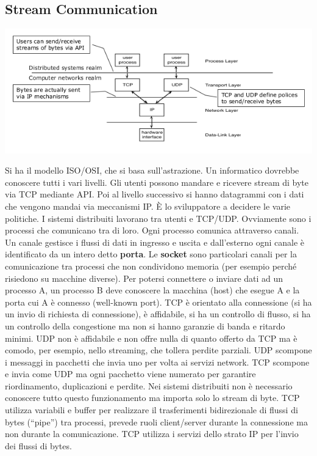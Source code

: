 \documentclass[a4paper,12pt, oneside]{book}
\begin{document}
\subsection{Stream Communication}
\begin{center}
\includegraphics[scale=2.5]{img/sc.png}
\end{center}
Si ha il modello ISO/OSI, che si basa sull'astrazione. Un informatico dovrebbe conoscere tutti i vari livelli. Gli utenti possono mandare e ricevere stream di byte via TCP mediante API. Poi al livello successivo si hanno datagrammi con i dati che vengono mandai via meccanismi IP. È lo sviluppatore a decidere le varie politiche. I sistemi distribuiti lavorano tra utenti e TCP/UDP. Ovviamente sono i processi che comunicano tra di loro. Ogni processo comunica attraverso canali. Un canale gestisce i flussi di dati in ingresso e uscita e dall'esterno ogni canale è identificato da un intero detto \textbf{porta}. Le \textbf{socket} sono particolari canali per la comunicazione tra processi che non condividono memoria (per esempio perché risiedono su macchine diverse). Per potersi connettere o inviare dati ad un processo A, un processo B deve conoscere la macchina (host) che esegue A e la porta cui A è connesso (well-known port).   TCP è orientato alla connessione (si ha un invio di richiesta di connessione), è affidabile, si ha un controllo di flusso, si ha un controllo della congestione ma non si hanno garanzie di banda e ritardo minimi. UDP non è affidabile e non offre nulla di quanto offerto da TCP ma è comodo, per esempio, nello streaming, che tollera perdite parziali. UDP scompone i messaggi in pacchetti che invia uno per volta ai servizi network. TCP scompone e invia come UDP ma ogni pacchetto viene numerato per garantire riordinamento, duplicazioni e perdite. Nei sistemi distribuiti non è necessario conoscere tutto questo funzionamento ma importa solo lo stream di byte. TCP utilizza variabili e buffer per realizzare il trasferimenti bidirezionale di flussi di bytes (“pipe”) tra processi, prevede ruoli client/server durante la connessione ma non durante la comunicazione. TCP utilizza i servizi dello strato IP per l'invio dei flussi di bytes.\\
\end{document}
